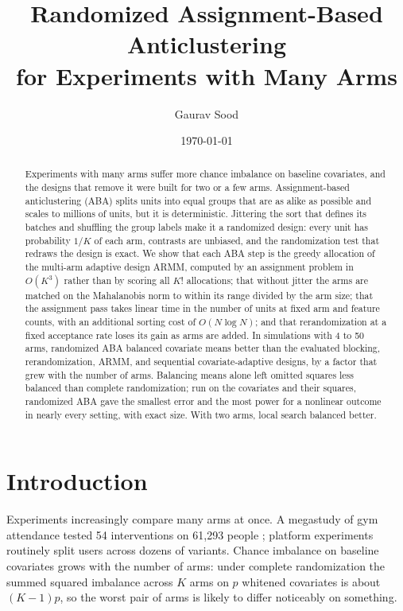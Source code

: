 \documentclass[11pt]{article}
\title{Randomized Assignment-Based Anticlustering\\for Experiments with Many Arms}
\author{Gaurav Sood}
\date{\today}
\theoremstyle{remark}
\begin{document}
\maketitle

\begin{abstract}
Experiments with many arms suffer more chance imbalance on baseline
covariates, and the designs that remove it were built for two or a few
arms. Assignment-based anticlustering (ABA) splits units into equal groups
that are as alike as possible and scales to millions of units, but it is
deterministic. Jittering the sort that defines its batches and shuffling the
group labels make it a randomized design: every unit has probability $1/K$
of each arm, contrasts are unbiased, and the randomization test that
redraws the design is exact. We show that each ABA step is the greedy
allocation of the multi-arm adaptive design ARMM, computed by an assignment
problem in $O(K^3)$ rather than by scoring all $K!$ allocations; that without
jitter the arms are matched on the Mahalanobis norm to within its range
divided by the arm size; that the assignment pass takes linear time in the
number of units at fixed arm and feature counts, with an additional sorting
cost of $O(N \log N)$; and that rerandomization at a fixed acceptance rate loses
its gain as arms are added. In simulations with 4 to 50 arms, randomized ABA
balanced covariate means better than the evaluated blocking, rerandomization,
ARMM, and sequential covariate-adaptive designs, by a factor that grew with
the number of arms. Balancing
means alone left omitted squares less balanced than complete randomization;
run on the covariates and their squares, randomized ABA gave the smallest
error and the most power for a nonlinear outcome in nearly every setting,
with exact size. With two arms, local search balanced better.
\end{abstract}

\section{Introduction}

Experiments increasingly compare many arms at once. A megastudy of gym
attendance tested 54 interventions on 61{,}293 people \citep{milkman2021};
platform experiments routinely split users across dozens of variants. Chance
imbalance on baseline covariates grows with the number of arms: under
complete randomization the summed squared imbalance across $K$ arms on $p$
whitened covariates is about $(K-1)p$, so the worst pair of arms is likely to
differ noticeably on something.
\end{document}
